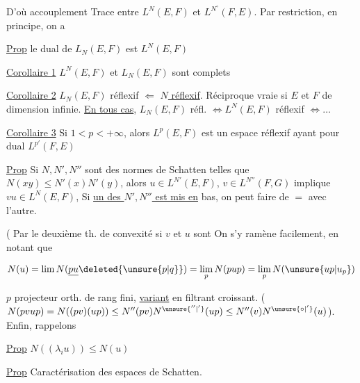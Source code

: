 D'où accouplement Trace entre $L^N(E,F)$ et  $L^{N^\circ}(F,E)$. Par restriction,  en principe, on a

\uline{Prop} le dual de $L_N(E,F)$ est $L^N(E,F)$

\uline{Corollaire 1} $L^N(E,F)$ et $L_N(E,F)$ sont complets

\uline{Corollaire 2} $L_N(E,F)$ réflexif $\Leftarrow$ \uline{$N$ réflexif}.  Réciproque vraie si $E$ et $F$ de dimension infinie. \uline{En tous cas}, $L_N(E,F)$ réfl. $\Longleftrightarrow L^N(E,F)$ réflexif $\Longleftrightarrow\ldots$

\uline{Corollaire 3} Si $1<p<+\infty$, alors $L^p(E,F)$ est un espace réflexif ayant pour dual $L^{p'}(F,E)$

\uline{Prop} Si $N,N',N''$ sont des normes de Schatten telles que $N(xy)\leq N'(x)N'(y)$, alors $u\in L^{N'}(E,F)$, $v\in L^{N''}(F,G)$ implique $vu\in L^N(E,F)$,  Si \uline{un des  $N',N''$ est mis en} bas, on peut faire de $=$ avec l'autre. 

(  Par le deuxième th. de convexité si $v$ et $u$ sont    On s'y ramène facilement, en notant que 

\[
N(u)=\lim N(\underline{pu}\deleted{\unsure{p|q}})=\lim_p N(pup)=\lim_p N(\unsure{up|u_p})
\]

$p$ projecteur orth. de rang fini, \uline{variant} en filtrant croissant. ( $N(pvup)=N((pv)(up))\leq N''(pv)N^{\unsure{''|'}}(up)\leq N''(v)N^{\unsure{\circ|'}}(u)$). Enfin, rappelons

\uline{Prop} $N((\lambda_i u))\leq N(u)$

\uline{Prop} Caractérisation des espaces de Schatten.



